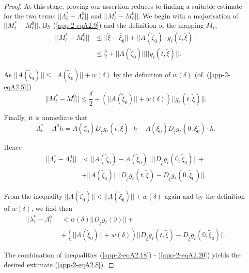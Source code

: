 \begin{proof}
At this stage, proving our assertion reduces to finding a suitable
estimate for the two terms $||\Lambda_{\ell}^{*} -
\Lambda_{\ell}^{0}||$ and $||M_{\ell}^{*} - M_{\ell}^{0}||$. We begin
with a majorisation of $||M_{\ell}^{*} - M_{\ell}^{0}||$. By (\ref{app-2-eqA2.9})
and the definition of the mapping $M_{\ell}$,
\begin{align*}
||M_{\ell}^{*} - M_{\ell}^{0}|| & \leq || \widetilde{\xi} -
\widetilde{\xi_{0}}|| + ||A( \widetilde{\zeta}_{0}) \cdot g_{\ell} (t,
 \widetilde{\xi})||\\
& \leq \frac{\delta}{2} + ||A( \widetilde{\zeta}_{0})|| ||g_{\ell}(t,
 \widetilde{\xi})||. 
\end{align*}

As $||A( \widetilde{\zeta}_{0})|| \leq ||A( \widetilde{\xi}_{0})|| +
w(\delta)$ by the definition of $w(\delta)$ (of. (\ref{app-2-eqA2.5}))
\begin{equation*}
||M_{\ell}^{*} - M_{\ell}^{0}|| \leq \frac{\delta}{2} + \left(||A(
\widetilde{\xi}_{0})|| + w(\delta)\right) ||g_{\ell}(t,
\widetilde{\xi})||.\tag{A2.19} \label{app-2-eqA2.19}
\end{equation*}

Finally, it is immediate that
$$
\Lambda_{\ell}^{*} - \Lambda^{0}  \widetilde{h} = A(
\widetilde{\zeta}_{0}) D_{ \widetilde{\xi}}g_{\ell} (t,
\widetilde{\xi}) \cdot  \widetilde{h} - A( \widetilde{\xi}_{0}) D_{
  \widetilde{\xi}}g_{\ell} (0,  \widetilde{\xi}_{0}) \cdot  \widetilde{h}.
$$

Hence
\begin{align*}
||\Lambda_{\ell}^{*} - \Lambda_{\ell}^{0}|| & < ||A(
\widetilde{\zeta}_{0}) - A( \widetilde{\xi}_{0})|| ||D_{
  \widetilde{\xi}}g_{\ell} (0,  \widetilde{\xi}_{0})|| +\\
& + ||A( \widetilde{\zeta}_{0})|| ||D_{ \widetilde{\xi}}g_{\ell} (t,
\widetilde{\xi}) - D_{\widetilde{\xi}} g_{\ell} (0,  \widetilde{\xi}_{0})||.
\end{align*}

From the inequality $||A( \widetilde{\zeta}_{0})|| < ||A(
\widetilde{\xi}_{0})|| + w(\delta)$ again and by the definition of
$w(\delta)$, we find then
\begin{align*}
||\lambda_{\ell}^{*} - \Lambda_{\ell}^{0}|| & < w(\delta) ||D_{
  \widetilde{\xi}}g_{\ell}(0)|| + \\
& + (||A( \widetilde{\xi}_{0})|| + w(\delta)) ||D_{
  \widetilde{\xi}}g_{\ell} (t,  \widetilde{\xi}) - D_{
  \widetilde{\xi}}g_{\ell}(0,  \widetilde{\xi}_{0})||.\tag{A2.20}\label{app-2-eqA2.20}
\end{align*}

The combination of inequalities (\ref{app-2-eqA2.18}) - (\ref{app-2-eqA2.20}) yields the desired extimate (\ref{app-2-eqA2.8}).
\end{proof}

